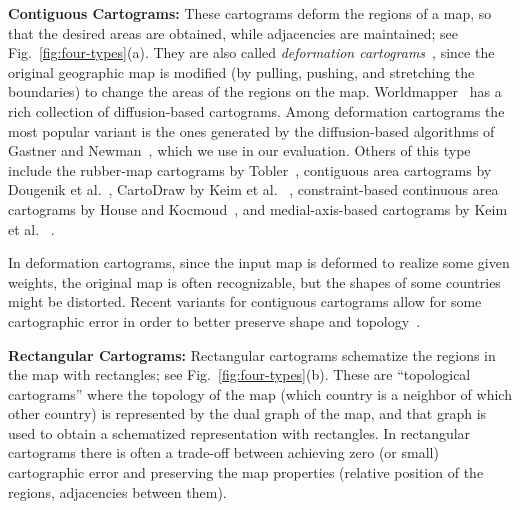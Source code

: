 \documentclass[10pt,journal,compsoc]{IEEEtran}
\begin{document}
\textbf{Contiguous Cartograms: }
These cartograms deform the regions of a map, so that the desired areas are obtained, while
 adjacencies are maintained; see Fig.~\ref{fig:four-types}(a). 
They are also called \textit{deformation cartograms}~\cite{AKV15}, since
 the original geographic map is modified (by pulling, pushing, and stretching the boundaries) to change
 the areas of the regions on the map. Worldmapper~\cite{WorldMapper} has a rich collection of diffusion-based cartograms.
Among deformation cartograms the most popular variant is the ones generated by the diffusion-based algorithms of Gastner and Newman~\cite{GN04}, which we use in our evaluation. Others of this type include the rubber-map cartograms by Tobler~\cite{Tobler73}, contiguous area cartograms by Dougenik et al.~\cite{DCN85}, 
CartoDraw by Keim et al. ~\cite{KNPS03}, constraint-based continuous area cartograms by House and Kocmoud~\cite{HK98}, and medial-axis-based cartograms by Keim et al. ~\cite{KPN05}. 


In deformation cartograms, since the input map is deformed to realize some given weights, the original map is often  recognizable, but the shapes of some countries might be distorted.
Recent variants for contiguous cartograms allow for some cartographic error in order to better preserve shape and topology~\cite{zackary_blog}. 


\textbf{Rectangular Cartograms:} 
Rectangular cartograms schematize the regions in the map with rectangles; see Fig.~\ref{fig:four-types}(b). 
These are ``topological cartograms'' where the topology of the map (which country is a neighbor of which other country) is represented by the dual graph of the map, and that graph is used to obtain a schematized representation with rectangles. In rectangular cartograms there is often a trade-off between achieving zero (or small) cartographic error and preserving the map properties (relative position of the regions, adjacencies between them). 
\end{document}
